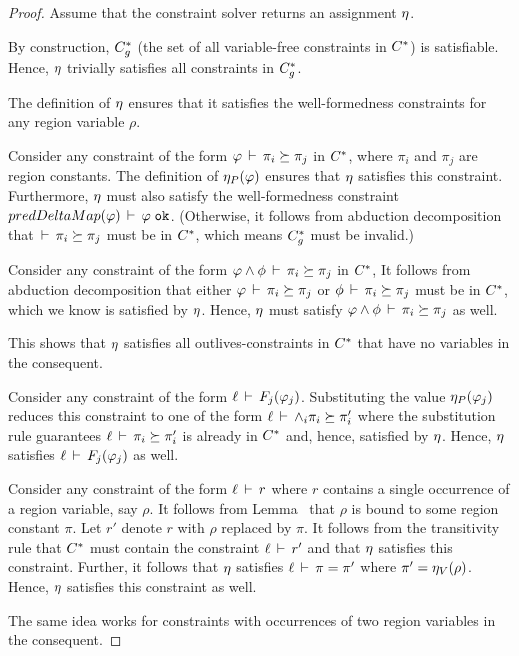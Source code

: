 \begin{proof}
Assume that the constraint solver returns an assignment $\eta$.

By construction, ${C}^*_g$ (the set of all variable-free constraints in ${C}^*$)
is satisfiable. Hence, $\eta$ trivially satisfies all constraints in ${C}^*_g$.

The definition of $\eta$ ensures that it satisfies the well-formedness constraints
for any region variable $\rho$.

Consider any constraint of the form $\varphi\,\vdash\,\pi_i \succeq \pi_j$ in ${C}^*$,
where $\pi_i$ and $\pi_j$ are region constants. The definition of $\eta_P(\varphi)$
ensures that $\eta$ satisfies this constraint.
Furthermore, $\eta$ must also satisfy the well-formedness constraint
$predDeltaMap(\varphi)\,\vdash\,\varphi \; \texttt{ok}$.
(Otherwise, it follows from abduction decomposition that $\,\vdash\,\pi_i \succeq \pi_j$ must
be in ${C}^*$, which means ${C}^*_g$ must be invalid.)

Consider any constraint of the form $\varphi \wedge \phi\,\vdash\,\pi_i \succeq \pi_j$ in ${C}^*$,
It follows from abduction decomposition that either
$\varphi\,\vdash\,\pi_i \succeq \pi_j$
or
$\phi\,\vdash\,\pi_i \succeq \pi_j$ must be in ${C}^*$, which we know is satisfied by $\eta$.
Hence, $\eta$ must satisfy
$\varphi \wedge \phi\,\vdash\,\pi_i \succeq \pi_j$ as well.

This shows that $\eta$ satisfies all outlives-constraints in ${C}^*$ that have no variables in the consequent.

Consider any constraint of the form $\ell\,\vdash\,F_j(\varphi_j)$.
Substituting the value $\eta_P(\varphi_j)$ reduces this constraint to one of
the form $\ell\,\vdash\,\wedge_i \pi_i \succeq \pi_i'$ where the substitution rule
guarantees $\ell\,\vdash\,\pi_i \succeq \pi_i'$ is already in ${C}^*$ and, hence,
satisfied by $\eta$.
Hence, $\eta$ satisfies $\ell\,\vdash\,F_j(\varphi_j)$ as well.

Consider any constraint of the form $\ell\,\vdash\,r$ where $r$ contains a single occurrence
of a region variable, say $\rho$.
It follows from Lemma~\label{lemma:completely-bound} that $\rho$ is bound to some region
constant $\pi$.
Let $r'$ denote $r$ with $\rho$ replaced by $\pi$.
It follows from the transitivity rule that ${C}^*$ must contain the constraint $\ell\,\vdash\,r'$
and that $\eta$ satisfies this constraint.
Further, it follows that $\eta$ satisfies $\ell\,\vdash\,\pi = \pi'$ where $\pi' = \eta_V(\rho)$.
Hence, $\eta$ satisfies this constraint as well.

The same idea works for constraints with occurrences of two region variables in the consequent.

\end{proof}

